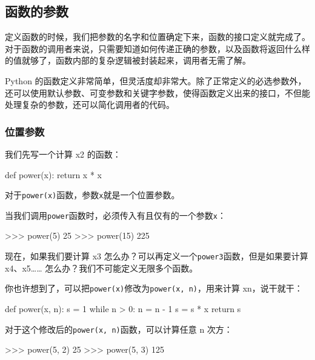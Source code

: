 \hypertarget{ux51fdux6570ux7684ux53c2ux6570}{%
\subsection{函数的参数}\label{ux51fdux6570ux7684ux53c2ux6570}}

定义函数的时候，我们把参数的名字和位置确定下来，函数的接口定义就完成了。对于函数的调用者来说，只需要知道如何传递正确的参数，以及函数将返回什么样的值就够了，函数内部的复杂逻辑被封装起来，调用者无需了解。

Python
的函数定义非常简单，但灵活度却非常大。除了正常定义的必选参数外，还可以使用默认参数、可变参数和关键字参数，使得函数定义出来的接口，不但能处理复杂的参数，还可以简化调用者的代码。

\hypertarget{ux4f4dux7f6eux53c2ux6570}{%
\subsubsection{位置参数}\label{ux4f4dux7f6eux53c2ux6570}}

我们先写一个计算 x2 的函数：

\begin{pythoncode}
def power(x):
    return x * x
\end{pythoncode}

对于\texttt{power(x)}函数，参数\texttt{x}就是一个位置参数。

当我们调用\texttt{power}函数时，必须传入有且仅有的一个参数\texttt{x}：

\begin{pythoncode}
>>> power(5)
25
>>> power(15)
225
\end{pythoncode}

现在，如果我们要计算 x3
怎么办？可以再定义一个\texttt{power3}函数，但是如果要计算
x4、x5\ldots\ldots{} 怎么办？我们不可能定义无限多个函数。

你也许想到了，可以把\texttt{power(x)}修改为\texttt{power(x,\ n)}，用来计算
xn，说干就干：

\begin{pythoncode}
def power(x, n):
    s = 1
    while n > 0:
        n = n - 1
        s = s * x
    return s
\end{pythoncode}

对于这个修改后的\texttt{power(x,\ n)}函数，可以计算任意 n 次方：

\begin{pythoncode}
>>> power(5, 2)
25
>>> power(5, 3)
125
\end{pythoncode}

